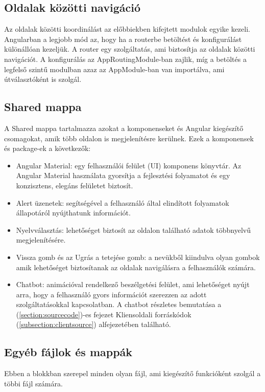 \subsection{Oldalak közötti navigáció}
Az oldalak közötti koordinálást\cite{navigation} az előbbiekben kifejtett modulok egyike kezeli. Angularban a legjobb mód az, hogy ha a routerbe betöltést és konfigurálást különállóan kezeljük. A router egy szolgáltatás, ami biztosítja az oldalak közötti navigációt. A konfigurálás az AppRoutingModule-ban zajlik, míg a betöltés a legfelső szintű modulban azaz az AppModule-ban van importálva, ami útválasztóként is szolgál.

\subsection{Shared mappa}
A Shared mappa tartalmazza azokat a komponenseket és Angular kiegészítő csomagokat, amik több oldalon is megjelenítésre kerülnek. Ezek a komponensek és package-ek a következők:

\begin{itemize}
	\item Angular Material\cite{material}: egy felhasználói felület (UI) komponens könyvtár. Az Angular Material használata gyorsítja a fejlesztési folyamatot és egy konzisztens, elegáns felületet biztosít.
	\item Alert üzenetek: segítségével a felhasználó által elindított folyamatok állapotáról nyújthatunk információt.
	\item Nyelvválasztás: lehetőséget biztosít az oldalon található adatok többnyelvű megjelenítésére.
	\item Vissza gomb és az Ugrás a tetejése gomb: a nevükből kiindulva olyan gombok amik lehetőséget biztosítanak az oldalak navigálásra a felhasználók számára.
	\item Chatbot: animációval rendelkező beszélgetési felület, ami lehetőséget nyújt arra, hogy a felhasználó gyors információt szerezzen az adott szolgáltatásokkal kapcsolatban. A chatbot részletes bemutatása a (\ref{section:sourcecode})-es fejezet Kliensoldali forráskódok (\ref{subsection:clientsource}) alfejezetében található.
\end{itemize}

\subsection{Egyéb fájlok és mappák}
Ebben a blokkban szerepel minden olyan fájl, ami kiegészítő funkcióként szolgál a többi fájl számára.

